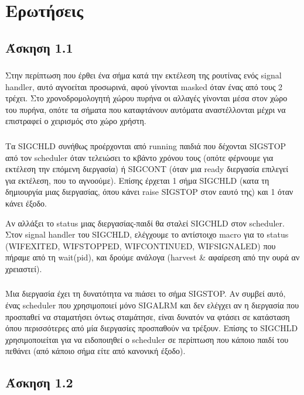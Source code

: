 \documentclass[a4paper,10pt]{article} \usepackage{anysize}
\begin{document}
\renewcommand{\theenumi}{\roman{enumi}}

\section*{Ερωτήσεις}
\setcounter{section}{3}
\subsection{Άσκηση 1.1}
\subsubsection{}
Στην περίπτωση που έρθει ένα σήμα κατά την εκτέλεση της ρουτίνας ενός signal
handler, αυτό αγνοείται προσωρινά, αφού γίνονται masked όταν ένας από τους 2
τρέχει. Στο χρονοδρομολογητή χώρου πυρήνα οι αλλαγές γίνονται μέσα στον χώρο
του πυρήνα, οπότε τα σήματα που καταφτάνουν αυτόματα αναστέλλονται μέχρι να
επιστραφεί ο χειρισμός στο χώρο χρήστη.
\subsubsection{}
Τα SIGCHLD συνήθως προέρχονται από running παιδιά που δέχονται SIGSTOP από τον
scheduler όταν τελειώσει το κβάντο χρόνου τους (οπότε φέρνουμε για εκτέλεση
την επόμενη διεργασία) ή SIGCONT (όταν μια ready διεργασία επιλεγεί για
εκτέλεση, που το αγνοούμε). Επίσης έρχεται 1 σήμα SIGCHLD (κατα τη δημιουργία
μιας διεργασίας, όπου κάνει raise SIGSTOP στον εαυτό της) και 1 όταν κάνει
έξοδο.

Αν αλλάξει το status μιας διεργασίας-παιδί θα σταλεί SIGCHLD στον scheduler.
Στον signal handler του SIGCHLD, ελέγχουμε το αντίστοιχο macro για το
status (WIFEXITED, WIFSTOPPED, WIFCONTINUED, WIFSIGNALED) που πήραμε από τη
wait(pid), και δρούμε ανάλογα (harvest \& αφαίρεση από την ουρά αν χρειαστεί).
\subsubsection{}
Μια διεργασία έχει τη δυνατότητα να πιάσει το σήμα SIGSTΟP. Αν συμβεί αυτό,
ένας scheduler που χρησιμοποιεί μόνο SIGALRM και δεν ελέγχει αν η διεργασία
που προσπαθεί να σταματήσει όντως σταμάτησε, είναι δυνατόν να φτάσει σε
κατάσταση όπου περισσότερες από μία διεργασίες προσπαθούν να τρέξουν. Επίσης
το SIGCHLD χρησιμοποιείται για να ειδοποιηθεί ο scheduler σε περίπτωση που
κάποιο παιδί του πεθάνει (από κάποιο σήμα είτε από κανονική έξοδο).

\subsection{Άσκηση 1.2}
\end{document}
